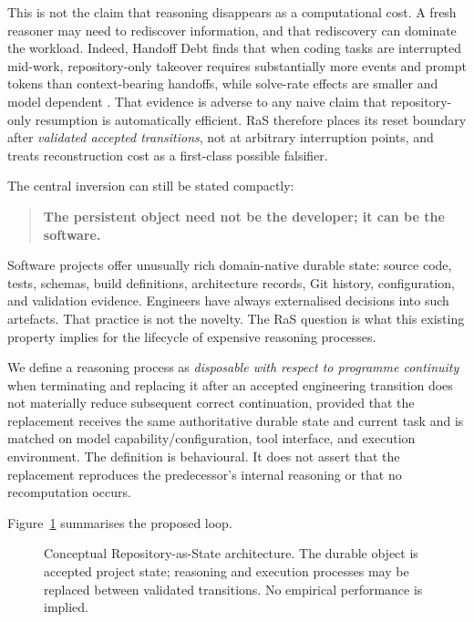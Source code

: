 This is not the claim that reasoning disappears as a computational cost. A fresh reasoner may need to rediscover information, and that rediscovery can dominate the workload. Indeed, Handoff Debt finds that when coding tasks are interrupted mid-work, repository-only takeover requires substantially more events and prompt tokens than context-bearing handoffs, while solve-rate effects are smaller and model dependent \citep{kc2026handoff}. That evidence is adverse to any naive claim that repository-only resumption is automatically efficient. RaS therefore places its reset boundary after \emph{validated accepted transitions}, not at arbitrary interruption points, and treats reconstruction cost as a first-class possible falsifier.

The central inversion can still be stated compactly:

\begin{quote}
\textbf{The persistent object need not be the developer; it can be the software.}
\end{quote}

Software projects offer unusually rich domain-native durable state: source code, tests, schemas, build definitions, architecture records, Git history, configuration, and validation evidence. Engineers have always externalised decisions into such artefacts. That practice is not the novelty. The RaS question is what this existing property implies for the lifecycle of expensive reasoning processes.

We define a reasoning process as \emph{disposable with respect to programme continuity} when terminating and replacing it after an accepted engineering transition does not materially reduce subsequent correct continuation, provided that the replacement receives the same authoritative durable state and current task and is matched on model capability/configuration, tool interface, and execution environment. The definition is behavioural. It does not assert that the replacement reproduces the predecessor's internal reasoning or that no recomputation occurs.

Figure~\ref{fig:ras-architecture} summarises the proposed loop.

\begin{figure}[htbp]
\centering

\caption{Conceptual Repository-as-State architecture. The durable object is accepted project state; reasoning and execution processes may be replaced between validated transitions. No empirical performance is implied.}
\label{fig:ras-architecture}
\end{figure}

